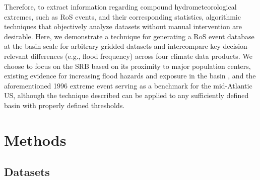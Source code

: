 \documentclass[nhess, manuscript]{copernicus}
\begin{document}
Therefore, to extract information regarding compound hydrometeorological extremes, such as RoS events, and their corresponding statistics, algorithmic techniques that objectively analyze datasets without manual intervention are desirable.
Here, we demonstrate a technique for generating a RoS event database at the basin scale for arbitrary gridded datasets and intercompare key decision-relevant differences (e.g., flood frequency) across four climate data products.
We choose to focus on the SRB based on its proximity to major population centers, existing evidence for increasing flood hazards and exposure in the basin \citep{sharma2021regional}, and the aforementioned 1996 extreme event serving as a benchmark for the mid-Atlantic US, although the technique described can be applied to any sufficiently defined basin with properly defined thresholds.


\section{Methods}

\subsection{Datasets}
\end{document}
